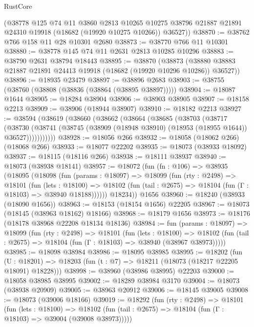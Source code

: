 \begin{lexlean}{RustCore}
\begin{coremodule}
      (@38778
        @125
        @74
        @11
        @3860
        @2813
        @10265
        @10275
        @38796
        @21887
        @21891
        @24310
        @19918
        (@18682 (@19920 @10275 @10266))
        @36527))
@38870 := @38762 @766 @158 @11 @28 @10301 @2680
@38873 := @38770 @766 @11 @10301
@38880 := @38778 @145 @74 @11 @2631 @2813 @10285 @10296
@38883 := @38790 @2631 @38794 @18443
@38895 := @38870
    (@38873 (@38880 @38883 @21887 @21891 @24413 @19918 (@18682 (@19920 @10296 @10286)) @36527))
@38896 := @18935 @23479
@38897 := @38896 @2683
@38903 := @38755 (@38760 (@38808 (@38836 (@38864 (@38895 @38897)))))
@38904 := @18087 @1644
@38905 := @18284 @38904
@38906 := @38903 @38905
@38907 := @18158 @2213
@38909 := @38906 (@18944 @38907)
@38910 := @18182 @2213
@38927 := @38594
    (@38619
      (@38660
        (@38662
          (@38664
            (@38685
              (@38703
                (@38717
                  (@38730
                    (@38741
                      (@38745 (@38909 (@18948 @38910) (@18953 (@18955 @1644)) @36527)))))))))))
@38928 := @18056 @266
@38932 := @18058 (@18062 @266) (@18068 @266)
@38933 := @18077 @22202
@38935 := @18073 (@38933 @18092)
@38937 := @18115 (@18116 @266)
@38938 := @18111 @38937
@38940 := @18073 (@38938 @18141)
@38957 := @18072
    (fun (fn : @106) =>
    @38935
      (@18095
        (@18098
          (fun (params : @18097) =>
          @18099
            (fun (rty : @2498) =>
            @18101
              (fun (lets : @18100) =>
              @18102 (fun (tail : @2675) => @18104 (fun (Γ : @18103) => @38940 @18188))))))
        @18234))
    @1656
@38960 := @18240 (@38933 (@18090 @1656))
@38963 := @18153 (@18154 @1656) @22205
@38967 := @18073 (@18145 (@38963 @18162) @18166)
@38968 := @18179 @1656
@38973 := @18176 (@18178 @38968 @22208 @18134 @18136)
@38984 := fun (params : @18097) =>
  @18099
    (fun (rty : @2498) =>
    @18101
      (fun (lets : @18100) =>
      @18102 (fun (tail : @2675) => @18104 (fun (Γ : @18103) => @38940 (@38967 @38973)))))
@38985 := @18098 @38984
@38986 := @18095 @38985
@38995 := @18202
    (fun (U : @18201) => @18203 (fun (t : @7) => @18211 (@18073 (@18217 @22205 @18091) @18228)))
@38998 := @38960 (@38986 @38995) @22203
@39000 := @18058 @38985 @38995
@39002 := @18289 @38984 @3170
@39004 := @18073 (@38938 @20909)
@39005 := @38963 @20912
@39006 := @18145 @39005
@39008 := @18073 (@39006 @18166)
@39019 := @18292
    (fun (rty : @2498) =>
    @18101
      (fun (lets : @18100) =>
      @18102 (fun (tail : @2675) => @18104 (fun (Γ : @18103) => @39004 (@39008 @38973)))))

\end{coremodule}
\end{lexlean}
